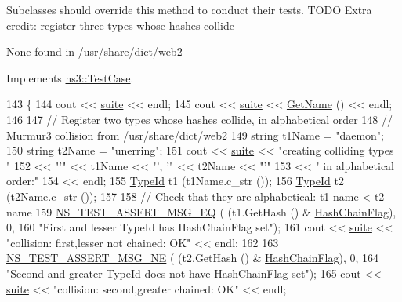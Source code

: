 Subclasses should override this method to conduct their tests. T\+O\+DO Extra credit\+: register three types whose hashes collide

None found in /usr/share/dict/web2

Implements \hyperlink{classns3_1_1TestCase_a8ff74680cf017ed42011e4be51917a24}{ns3\+::\+Test\+Case}.


\begin{DoxyCode}
143 \{
144   cout << \hyperlink{type-id-test-suite_8cc_ab4acb0fe33ca0947f675eed6196ed8ca}{suite} << endl;
145   cout << \hyperlink{type-id-test-suite_8cc_ab4acb0fe33ca0947f675eed6196ed8ca}{suite} << \hyperlink{classns3_1_1TestCase_a28f7bb59669c24dae1c290fc17fc9b62}{GetName} () << endl;
146   
147   \textcolor{comment}{// Register two types whose hashes collide, in alphabetical order}
148   \textcolor{comment}{// Murmur3 collision from /usr/share/dict/web2}
149   \textcolor{keywordtype}{string} t1Name = \textcolor{stringliteral}{"daemon"};
150   \textcolor{keywordtype}{string} t2Name = \textcolor{stringliteral}{"unerring"};
151   cout << \hyperlink{type-id-test-suite_8cc_ab4acb0fe33ca0947f675eed6196ed8ca}{suite} << \textcolor{stringliteral}{"creating colliding types "}
152        << \textcolor{stringliteral}{"'"} << t1Name << \textcolor{stringliteral}{"', '"} << t2Name << \textcolor{stringliteral}{"'"}
153        << \textcolor{stringliteral}{" in alphabetical order:"}
154        << endl;
155   \hyperlink{classns3_1_1TypeId}{TypeId} t1 (t1Name.c\_str ());
156   \hyperlink{classns3_1_1TypeId}{TypeId} t2 (t2Name.c\_str ());
157 
158   \textcolor{comment}{// Check that they are alphabetical: t1 name < t2 name}
159   \hyperlink{group__testing_ga2a9d78cffb3db8e867c35fff0b698cf5}{NS\_TEST\_ASSERT\_MSG\_EQ} ( (t1.GetHash () & \hyperlink{classCollisionTestCase_a548cc857844db44014bb02d25b46008ea91195d2ad8d7721b7e17cb95bbd76be5}{HashChainFlag}), 0,
160                          \textcolor{stringliteral}{"First and lesser TypeId has HashChainFlag set"});
161   cout << \hyperlink{type-id-test-suite_8cc_ab4acb0fe33ca0947f675eed6196ed8ca}{suite} << \textcolor{stringliteral}{"collision: first,lesser  not chained: OK"} << endl;
162 
163   \hyperlink{group__testing_ga73d66fb0050a5111453fd144e767b91a}{NS\_TEST\_ASSERT\_MSG\_NE} ( (t2.GetHash () & \hyperlink{classCollisionTestCase_a548cc857844db44014bb02d25b46008ea91195d2ad8d7721b7e17cb95bbd76be5}{HashChainFlag}), 0,
164                          \textcolor{stringliteral}{"Second and greater TypeId does not have HashChainFlag set"});
165   cout << \hyperlink{type-id-test-suite_8cc_ab4acb0fe33ca0947f675eed6196ed8ca}{suite} << \textcolor{stringliteral}{"collision: second,greater    chained: OK"} << endl;

\end{DoxyCode}
